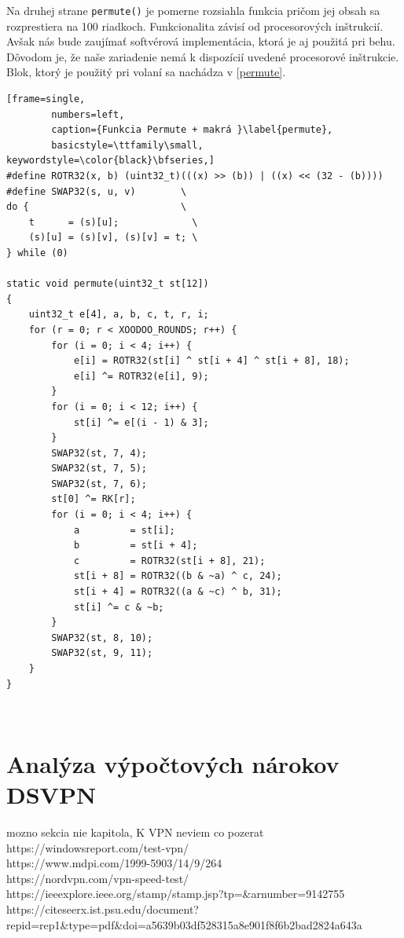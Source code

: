Na druhej strane \lstinline|permute()| je pomerne rozsiahla funkcia pričom jej obsah sa rozprestiera na 100 riadkoch. Funkcionalita závisí od procesorových inštrukcií. Avšak nás bude zaujímať softvérová implementácia, ktorá je aj použitá pri behu. Dôvodom je, že naše zariadenie nemá k dispozícií uvedené procesorové inštrukcie. Blok, ktorý je použitý pri volaní sa nachádza v \ref{permute}.   

\begin{minipage}{\linewidth} 	
	\begin{lstlisting}[frame=single,
		numbers=left,
		caption={Funkcia Permute + makrá }\label{permute},
		basicstyle=\ttfamily\small, keywordstyle=\color{black}\bfseries,]
#define ROTR32(x, b) (uint32_t)(((x) >> (b)) | ((x) << (32 - (b))))
#define SWAP32(s, u, v)        \
do {                           \
	t      = (s)[u];             \
	(s)[u] = (s)[v], (s)[v] = t; \
} while (0)
	
static void permute(uint32_t st[12])
{
	uint32_t e[4], a, b, c, t, r, i;	
	for (r = 0; r < XOODOO_ROUNDS; r++) {
		for (i = 0; i < 4; i++) {
			e[i] = ROTR32(st[i] ^ st[i + 4] ^ st[i + 8], 18);
			e[i] ^= ROTR32(e[i], 9);
		}
		for (i = 0; i < 12; i++) {
			st[i] ^= e[(i - 1) & 3];
		}
		SWAP32(st, 7, 4);
		SWAP32(st, 7, 5);
		SWAP32(st, 7, 6);
		st[0] ^= RK[r];
		for (i = 0; i < 4; i++) {
			a         = st[i];
			b         = st[i + 4];
			c         = ROTR32(st[i + 8], 21);
			st[i + 8] = ROTR32((b & ~a) ^ c, 24);
			st[i + 4] = ROTR32((a & ~c) ^ b, 31);
			st[i] ^= c & ~b;
		}
		SWAP32(st, 8, 10);
		SWAP32(st, 9, 11);
	}	
}
	\end{lstlisting}
\end{minipage}\\ 
\section{Analýza výpočtových nárokov DSVPN}\label{analyza}
mozno sekcia nie kapitola, K VPN neviem co pozerat 
https://windowsreport.com/test-vpn/ \\
https://www.mdpi.com/1999-5903/14/9/264 \\
https://nordvpn.com/vpn-speed-test/ \\
https://ieeexplore.ieee.org/stamp/stamp.jsp?tp=\&arnumber=9142755 \\
https://citeseerx.ist.psu.edu/document?repid=rep1\&type=pdf\&doi=a5639b03df528315a8e901f8f6b2bad2824a643a \\